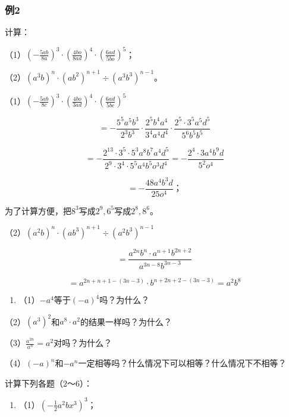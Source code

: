 \subsubsection{例2}

计算：

（1）\(\left(-\frac{5ab}{8a}\right)^3 \cdot \left(\frac{4bo}{8ad}\right)^4 \cdot \left(\frac{6ad}{5bo}\right)^5\)；

（2）\((a^3 b)^n \cdot (ab^2)^{n+1} \div (a^3 b^3)^{n-1}\)。


（1）\(\left(-\frac{5ab}{8c}\right)^3 \cdot \left(\frac{4bo}{3ad}\right)^4 \cdot \left(\frac{6ad}{5bc}\right)^5\)

\[
= - \frac{5 ^ {5} a ^ {5} b ^ {3}}{2 ^ {3} b ^ {3}} \cdot \frac{2 ^ {5} b ^ {4} a ^ {4}}{3 ^ {4} a ^ {4} d ^ {4}} \cdot \frac{2 ^ {5} \cdot 3 ^ {5} a ^ {5} d ^ {5}}{5 ^ {6} b ^ {5} b ^ {5}}
\]

\[
= - \frac{2 ^ {13} \cdot 3 ^ {5} \cdot 5 ^ {3} a ^ {8} b ^ {7} a ^ {4} d ^ {5}}{2 ^ {9} \cdot 3 ^ {4} \cdot 5 ^ {5} a ^ {4} b ^ {5} o ^ {3} d ^ {4}} = - \frac{2 ^ {4} \cdot 3 a ^ {4} b ^ {9} d}{5 ^ {2} o ^ {4}}
\]

\[
= - \frac{48 a ^ {4} b ^ {3} d}{25 o ^ {4}}\text{；}
\]

为了计算方便，把\(8^{3}\)写成\(2^{9}, 6^{5}\)写成\(2^{8}, 8^{6}\)。

（2）\((a^{2}b)^{n} \cdot (ab^{3})^{n+1} \div (a^{2}b^{3})^{n-1}\)

\[
= \frac{a ^ {2 n} b ^ {n} \cdot a ^ {n + 1} b ^ {2 n + 2}}{a ^ {3 n - 8} b ^ {3 n - 3}}
\]

\[
= a ^ {2 n + n + 1 - (3 n - 3)} \cdot b ^ {n + 2 n + 2 - (3 n - 3)} = a ^ {2} b ^ {8}
\]

\begin{enumerate}
\item
  （1）\(-a^4\)等于\((-a)^4\)吗？为什么？
\end{enumerate}

（2）\((a^3)^2\)和\(a^8 \cdot a^2\)的结果一样吗？为什么？

（3）\(\frac{a^{2n}}{a^n} = a^2\)对吗？为什么？

（4）\((-a)^n\)和\(-a^n\)一定相等吗？什么情况下可以相等？什么情况下不相等？

计算下列各题（2～6）：

\begin{enumerate}[start=2]
\item
  （1）\(\left(-\frac{1}{2} a^2 b x^3\right)^3\)；
\end{enumerate}

